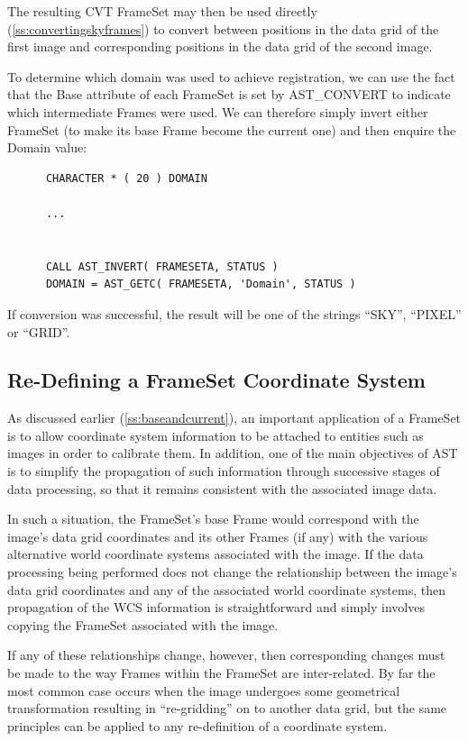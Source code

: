\documentclass[twoside,11pt]{article}
\newcommand{\htmlref}[2]{#1}
\newcommand{\secref}[1]{\S\ref{#1}}
\renewcommand{\secref}[1]{\ref{#1}}
\begin{document}
The resulting CVT FrameSet may then be used directly
(\secref{ss:convertingskyframes}) to convert between positions in the
data grid of the first image and corresponding positions in the data
grid of the second image.

To determine which domain was used to achieve registration,
we can use the fact that the \htmlref{Base}{Base} attribute of each FrameSet is set by
AST\_CONVERT to indicate which intermediate Frames were used. We
can therefore simply invert either FrameSet (to make its base Frame
become the current one) and then enquire the \htmlref{Domain}{Domain} value:

\small
\begin{verbatim}
      CHARACTER * ( 20 ) DOMAIN

      ...


      CALL AST_INVERT( FRAMESETA, STATUS )
      DOMAIN = AST_GETC( FRAMESETA, 'Domain', STATUS )
\end{verbatim}
\normalsize

If conversion was successful, the result will be one of the strings
``SKY'', ``PIXEL'' or ``GRID''.

\subsection{\label{ss:remapframe}Re-Defining a FrameSet Coordinate System}

As discussed earlier (\secref{ss:baseandcurrent}), an important
application of a \htmlref{FrameSet}{FrameSet} is to allow coordinate system information to
be attached to entities such as images in order to calibrate them. In
addition, one of the main objectives of AST is to simplify the
propagation of such information through successive stages of data
processing, so that it remains consistent with the associated image
data.

In such a situation, the FrameSet's base \htmlref{Frame}{Frame} would correspond with
the image's data grid coordinates and its other Frames (if any) with
the various alternative world coordinate systems associated with the
image.  If the data processing being performed does not change the
relationship between the image's data grid coordinates and any of the
associated world coordinate systems, then propagation of the WCS
information is straightforward and simply involves copying the
FrameSet associated with the image.

If any of these relationships change, however, then corresponding
changes must be made to the way Frames within the FrameSet are
inter-related. By far the most common case occurs when the image
undergoes some geometrical transformation resulting in ``re-gridding''
on to another data grid, but the same principles can be applied to any
re-definition of a coordinate system.
\end{document}
